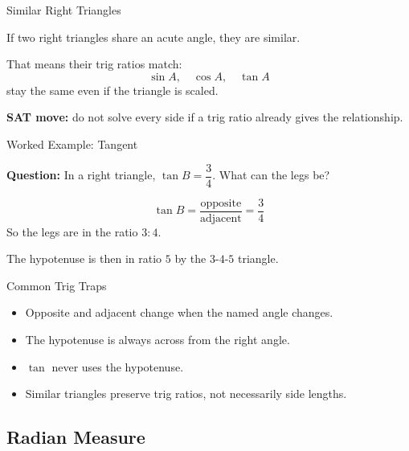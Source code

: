 \documentclass{beamer}
\begin{document}
\begin{frame}{Similar Right Triangles}

If two right triangles share an acute angle, they are similar.

\vspace{0.2cm}
That means their trig ratios match:
\[
\sin A,\quad \cos A,\quad \tan A
\]
stay the same even if the triangle is scaled.

\vspace{0.2cm}
\textbf{SAT move:} do not solve every side if a trig ratio already gives the relationship.

\end{frame}

\begin{frame}{Worked Example: Tangent}

\textbf{Question:} In a right triangle, $\tan B=\dfrac{3}{4}$. What can the legs be?

\vspace{0.2cm}
\[
\tan B=\dfrac{\text{opposite}}{\text{adjacent}}=\dfrac{3}{4}
\]
So the legs are in the ratio $3:4$.

\vspace{0.2cm}
The hypotenuse is then in ratio $5$ by the $3$-$4$-$5$ triangle.

\end{frame}

\begin{frame}{Common Trig Traps}

\begin{itemize}
    \item Opposite and adjacent change when the named angle changes.
    \item The hypotenuse is always across from the right angle.
    \item $\tan$ never uses the hypotenuse.
    \item Similar triangles preserve trig ratios, not necessarily side lengths.
\end{itemize}

\end{frame}

\begin{frame}
\section{Radian Measure}
\end{frame}
\end{document}
